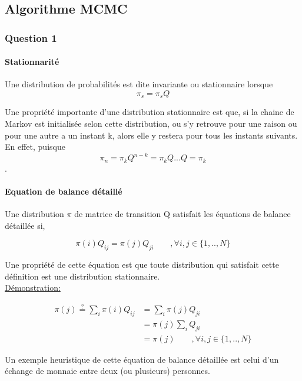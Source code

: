 \documentclass[12pt]{article}
\begin{document}
\subsection{Algorithme MCMC}
\subsubsection*{Question 1}
\paragraph{Stationnarité}
Une distribution de probabilités est dite invariante ou stationnaire lorsque $$\pi_s = \pi_sQ$$

Une propriété importante d'une distribution stationnaire est que, si la chaine de
Markov est initialisée selon cette distribution, ou s'y retrouve pour une raison ou
pour une autre a un instant k, alors elle y restera pour tous les instants suivants.
En effet, puisque $$\pi_n = \pi_kQ^{n-k} = \pi_kQ...Q = \pi_k$$.

\paragraph{Equation de balance détaillé}

Une distribution $\pi$ de matrice de transition Q satisfait les équations de balance détaillée si,

\begin{equation}
\pi(i)Q_{ij} = \pi(j)Q_{ji} \qquad ,\forall i,j \in \{1,..,N\}
\end{equation}

Une propriété de cette équation est que toute distribution qui satisfait cette définition est une distribution stationnaire. \\

\underline{Démonstration:}

\begin{equation}
\begin{split}
\pi(j) \stackrel{?}{=} \sum_i{\pi(i)Q_{ij}} & = \sum_i{\pi(j)Q_{ji}} \\
& = \pi(j) \sum_i{Q_{ji}} \\
& = \pi(j) \qquad ,\forall i,j \in \{1,..,N\}
\end{split}
\label{eq2}
\end{equation}

Un exemple heuristique de cette équation de balance détaillée est celui d'un échange de monnaie entre deux (ou plusieurs) personnes.
\end{document}
